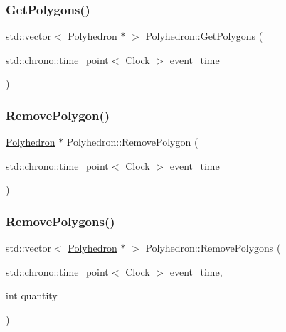 \mbox{\label{classPolyhedron_adeaf461cc8504a225f6344b954c196a8}} 
\subsubsection{\texorpdfstring{Get\+Polygons()}{GetPolygons()}}
{\footnotesize\ttfamily std\+::vector$<$ \mbox{\hyperlink{classPolyhedron}{Polyhedron}} $\ast$ $>$ Polyhedron\+::\+Get\+Polygons (\begin{DoxyParamCaption}\item[{std\+::chrono\+::time\+\_\+point$<$ \mbox{\hyperlink{universe_8h_a0ef8d951d1ca5ab3cfaf7ab4c7a6fd80}{Clock}} $>$}]{event\+\_\+time }\end{DoxyParamCaption})}

\mbox{\label{classPolyhedron_a3b411fa617291a2a2d5df92b819285b4}} 
\subsubsection{\texorpdfstring{Remove\+Polygon()}{RemovePolygon()}}
{\footnotesize\ttfamily \mbox{\hyperlink{classPolyhedron}{Polyhedron}} $\ast$ Polyhedron\+::\+Remove\+Polygon (\begin{DoxyParamCaption}\item[{std\+::chrono\+::time\+\_\+point$<$ \mbox{\hyperlink{universe_8h_a0ef8d951d1ca5ab3cfaf7ab4c7a6fd80}{Clock}} $>$}]{event\+\_\+time }\end{DoxyParamCaption})}

\mbox{\label{classPolyhedron_a5c2639b21aec25b76449fdf4c209aad1}} 
\subsubsection{\texorpdfstring{Remove\+Polygons()}{RemovePolygons()}}
{\footnotesize\ttfamily std\+::vector$<$ \mbox{\hyperlink{classPolyhedron}{Polyhedron}} $\ast$ $>$ Polyhedron\+::\+Remove\+Polygons (\begin{DoxyParamCaption}\item[{std\+::chrono\+::time\+\_\+point$<$ \mbox{\hyperlink{universe_8h_a0ef8d951d1ca5ab3cfaf7ab4c7a6fd80}{Clock}} $>$}]{event\+\_\+time,  }\item[{int}]{quantity }\end{DoxyParamCaption})}

